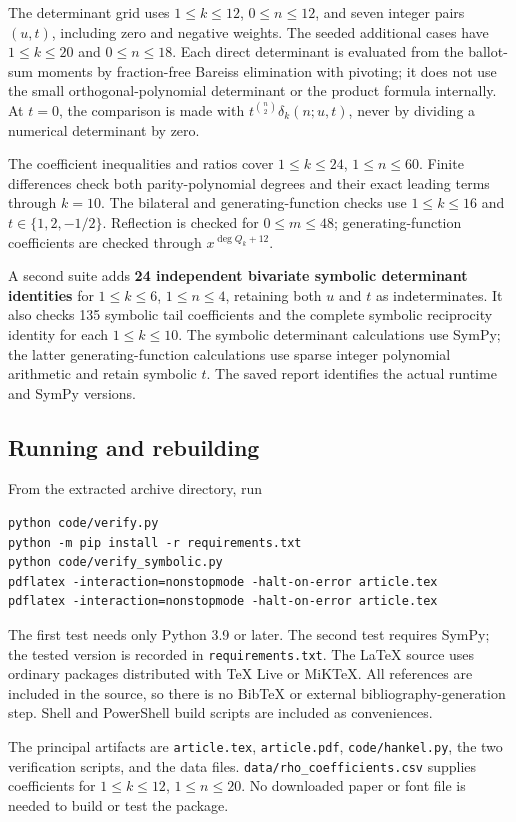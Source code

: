 \documentclass[11pt,letterpaper]{article}
\numberwithin{equation}{section}
\theoremstyle{definition}
\begin{document}
The determinant grid uses \(1\le k\le12\), \(0\le n\le12\), and
seven integer pairs \((u,t)\), including zero and negative weights.
The seeded additional cases have \(1\le k\le20\) and
\(0\le n\le18\). Each direct determinant is evaluated from the
ballot-sum moments by fraction-free Bareiss elimination with pivoting;
it does not use the small orthogonal-polynomial determinant or the
product formula internally. At \(t=0\), the comparison is made with
\(t^{\binom n2}\delta_k(n;u,t)\), never by dividing a numerical
determinant by zero.

The coefficient inequalities and ratios cover
\(1\le k\le24\), \(1\le n\le60\).
Finite differences check both parity-polynomial degrees and their exact
leading terms through \(k=10\).
The bilateral and generating-function checks use \(1\le k\le16\)
and \(t\in\{1,2,-1/2\}\). Reflection is checked for
\(0\le m\le48\); generating-function coefficients are checked through
\(x^{\deg Q_k+12}\).

A second suite adds \textbf{24 independent bivariate symbolic determinant
identities} for \(1\le k\le6\), \(1\le n\le4\), retaining both
\(u\) and \(t\) as indeterminates. It also checks 135 symbolic tail
coefficients and the complete symbolic reciprocity identity for each
\(1\le k\le10\). The symbolic determinant calculations use SymPy;
the latter generating-function calculations use sparse integer polynomial
arithmetic and retain symbolic \(t\). The saved report identifies the
actual runtime and SymPy versions.

\subsection{Running and rebuilding}
From the extracted archive directory, run
\begin{lstlisting}
python code/verify.py
python -m pip install -r requirements.txt
python code/verify_symbolic.py
pdflatex -interaction=nonstopmode -halt-on-error article.tex
pdflatex -interaction=nonstopmode -halt-on-error article.tex
\end{lstlisting}
The first test needs only Python 3.9 or later. The second test requires
SymPy; the tested version is recorded in \texttt{requirements.txt}.
The \LaTeX{} source uses ordinary packages distributed with TeX Live or
MiKTeX. All references are included in the source, so there is no BibTeX
or external bibliography-generation step. Shell and PowerShell build
scripts are included as conveniences.

The principal artifacts are \texttt{article.tex}, \texttt{article.pdf},
\texttt{code/hankel.py}, the two verification scripts, and the data files.
\texttt{data/rho\_coefficients.csv} supplies coefficients for
\(1\le k\le12\), \(1\le n\le20\). No downloaded paper or font file
is needed to build or test the package.
\end{document}
